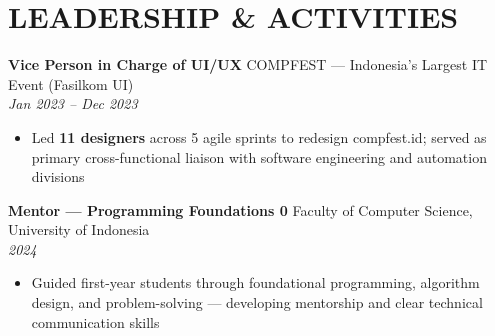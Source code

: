 \documentclass[10pt,a4paper]{article}
\newcommand{\experienceheader}[4]{
    \textbf{#1} \hfill #2 \\
    \textit{#3} \hfill \textit{#4}
}
\begin{document}
\vspace{-3pt}

\section*{LEADERSHIP \& ACTIVITIES}

\experienceheader{Vice Person in Charge of UI/UX}{COMPFEST — Indonesia's Largest IT Event (Fasilkom UI)}{}{Jan 2023 -- Dec 2023}
\begin{itemize}[leftmargin=*, itemsep=0.5pt, topsep=0.5pt]
    \item Led \textbf{11 designers} across 5 agile sprints to redesign compfest.id; served as primary cross-functional liaison with software engineering and automation divisions
\end{itemize}

\vspace{1pt}

\experienceheader{Mentor — Programming Foundations 0}{Faculty of Computer Science, University of Indonesia}{}{2024}
\begin{itemize}[leftmargin=*, itemsep=0.5pt, topsep=0.5pt]
    \item Guided first-year students through foundational programming, algorithm design, and problem-solving — developing mentorship and clear technical communication skills
\end{itemize}
\end{document}
